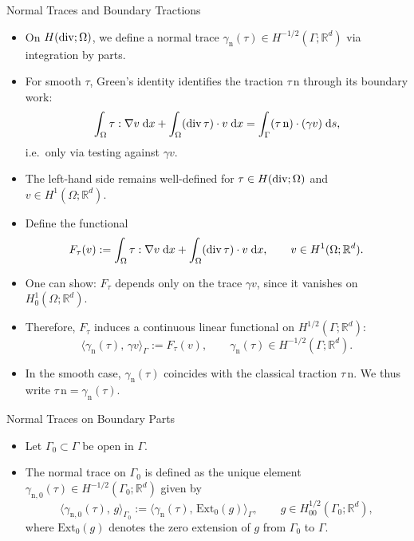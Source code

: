 \documentclass[10pt,aspectratio=169]{beamer}
\def\R{{\mathbb R}}
\def\d{{\mathrm{d}}}
\def\dx{{\d x}}
\def\ds{{\d s}}
\newcommand{\diver}{\operatornamewithlimits{div}}
\begin{document}
\begin{frame}{Normal Traces and Boundary Tractions}
	\begin{itemize}
		\item On $H(\diver;\Omega)$, we define a normal trace $\gamma_{\mathrm n}(\tau)\in H^{-1/2}(\Gamma;\R^d)$ via integration by parts.
		\item For smooth $\tau$, Green's identity identifies the traction $\tau\,\mathrm n$ through its boundary work:
		      \begin{equation*}
			      \int_\Omega \tau:\nabla v\;\dx+\int_\Omega (\diver\tau)\cdot v\;\dx
			      =
			      \int_\Gamma (\tau\,\mathrm n)\cdot (\gamma v)\;\ds,
		      \end{equation*}
		      i.e.\ only via testing against $\gamma v$.
		\item The left-hand side remains well-defined for $\tau\in H(\diver;\Omega)$ and $v\in H^1(\Omega;\R^d)$.
		\item Define the functional
		      \begin{equation*}
			      F_\tau(v):=\int_\Omega \tau:\nabla v\;\dx+\int_\Omega (\diver\tau)\cdot v\;\dx,
			      \qquad v\in H^1(\Omega;\R^d).
		      \end{equation*}
		\item One can show: $F_\tau$ depends only on the trace $\gamma v$, since it vanishes on $H^1_0(\Omega;\R^d)$.
		\item Therefore, $F_\tau$ induces a continuous linear functional on $H^{1/2}(\Gamma;\R^d)$:
		      \begin{equation*}
			      \langle \gamma_{\mathrm n}(\tau),\,\gamma v\rangle_\Gamma := F_\tau(v),
			      \qquad \gamma_{\mathrm n}(\tau)\in H^{-1/2}(\Gamma;\R^d).
		      \end{equation*}
		\item In the smooth case, $\gamma_{\mathrm n}(\tau)$ coincides with the classical traction $\tau\,\mathrm n$. We thus write $\tau\,\mathrm{n} = \gamma_{\mathrm n}(\tau)$.
	\end{itemize}
\end{frame}

\begin{frame}{Normal Traces on Boundary Parts}
	\begin{itemize}
		\item Let $\Gamma_0\subset\Gamma$ be open in $\Gamma$.
		\item The normal trace on $\Gamma_0$ is defined as the unique element $\gamma_{\mathrm{n},0}(\tau)\in H^{-1/2}(\Gamma_0;\R^d)$ given by
		      \begin{equation*}
			      \langle \gamma_{\mathrm{n},0}(\tau),\,g\rangle_{\Gamma_0}
			      :=
			      \langle \gamma_{\mathrm{n}}(\tau),\,\mathrm{Ext}_0 (g)\rangle_{\Gamma},
			      \qquad g\in H^{1/2}_{00}(\Gamma_0;\R^d),
		      \end{equation*}
		      where $\mathrm{Ext}_0 (g)$ denotes the zero extension of $g$ from $\Gamma_0$ to $\Gamma$.
	\end{itemize}
\end{frame}
\end{document}
